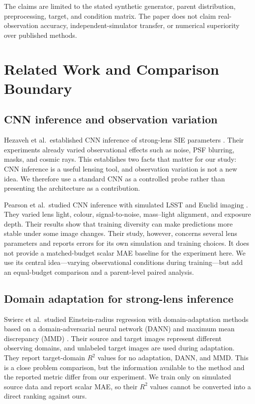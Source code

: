 \documentclass[letterpaper]{article}
\begin{document}
The claims are limited to the stated synthetic generator, parent distribution,
preprocessing, target, and condition matrix. The paper does not claim
real-observation accuracy, independent-simulator transfer, or numerical
superiority over published methods.

\section{Related Work and Comparison Boundary}

\subsection{CNN inference and observation variation}

Hezaveh et al.\ established CNN inference of strong-lens SIE parameters
\citep{hezaveh2017fast}. Their experiments already varied observational effects
such as noise, PSF blurring, masks, and cosmic rays. This establishes two facts
that matter for our study: CNN inference is a useful lensing tool, and
observation variation is not a new idea. We therefore use a standard CNN as a
controlled probe rather than presenting the architecture as a contribution.

Pearson et al.\ studied CNN inference with simulated LSST and Euclid imaging
\citep{pearson2019effect}. They varied lens light, colour, signal-to-noise,
mass--light alignment, and exposure depth. Their results show that training
diversity can make predictions more stable under some image changes. Their
study, however, concerns several lens parameters and reports errors for its own
simulation and training choices. It does not provide a matched-budget scalar
MAE baseline for the experiment here. We use its central idea---varying
observational conditions during training---but add an equal-budget comparison
and a parent-level paired analysis.

\subsection{Domain adaptation for strong-lens inference}

Swierc et al.\ studied Einstein-radius regression with domain-adaptation
methods based on a domain-adversarial neural network (DANN) and maximum mean
discrepancy (MMD) \citep{swierc2023domain}. Their source and target images
represent different observing domains, and unlabeled target images are used
during adaptation. They report target-domain $R^2$ values for no adaptation,
DANN, and MMD. This is a close problem comparison, but the information available
to the method and the reported metric differ from our experiment. We train
only on simulated source data and report scalar MAE, so their $R^2$ values
cannot be converted into a direct ranking against ours.
\end{document}
